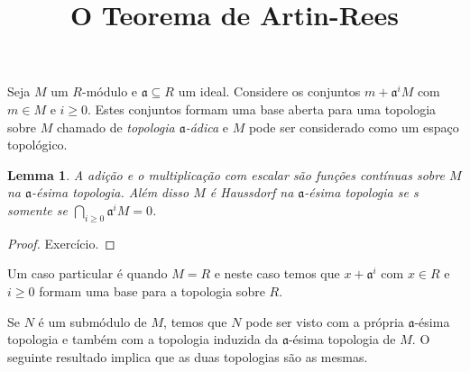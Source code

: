 \documentclass[12pt]{amsart}
\renewcommand{\a}{\mathfrak a}
\newtheorem{lemma}[theorem]{Lemma}
\theoremstyle{definition}
\begin{document}
\Large
\title{O Teorema de Artin-Rees}
\maketitle

Seja $M$ um $R$-módulo e $\a\subseteq R$ um ideal. Considere os conjuntos $m+\a^iM$ com $m\in M$ e 
$i\geq 0$. Estes conjuntos formam uma base aberta para uma topologia sobre $M$ chamado de 
\emph{topologia $\a$-ádica} e $M$ pode ser considerado como um espaço topológico. 

\begin{lemma}
    A adição e o multiplicação com escalar são funções contínuas sobre $M$ na $\a$-ésima topologia. 
    Além disso $M$ é Haussdorf na $\a$-ésima topologia se s somente se $\bigcap_{i\geq 0}\a^iM=0$.
\end{lemma}
\begin{proof} Exercício.
\end{proof}
Um caso particular é quando $M=R$ e neste caso temos que $x+\a^i$ com $x\in R$ e $i\geq 0$ formam uma 
base para a topologia sobre $R$. 

Se $N$ é um submódulo de $M$, temos que $N$ pode ser visto com a própria $\a$-ésima topologia e também com 
a topologia induzida da $\a$-ésima topologia de $M$. O seguinte resultado implica que as duas topologias são as mesmas.
\end{document}
